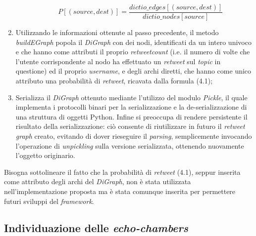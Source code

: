 \begin{enumerate}
\begin{itemize}
\begin{equation}
P[(source,dest)] = \frac{dictio\_edges[(source,dest)]}{dictio\_nodes[source]}
\end{equation}

\end{itemize}
\item Utilizzando le informazioni ottenute al passo precedente, il metodo \textit{buildEGraph} popola il \textit{DiGraph} con dei nodi, identificati da un intero univoco e che hanno come attributi il proprio \textit{retweetcount} (i.e. il numero di volte che l'utente corrispondente al nodo ha effettuato un \textit{retweet} sul \textit{topic} in questione) ed il proprio \textit{username}, e degli archi diretti, che hanno come unico attributo una probabilità di \textit{retweet}, ricavata dalla formula (4.1);

\item Serializza il \textit{DiGraph} ottenuto mediante l'utilizzo del modulo \textit{Pickle}, il quale implementa i protocolli binari per la serializzazione e la de-serializzazione di una struttura di oggetti Python. Infine si preoccupa di rendere persistente il risultato della serializzazione: ciò consente di riutilizzare in futuro il \textit{retweet graph} creato, evitando di dover rieseguire il \textit{parsing}, semplicemente invocando l'operazione di \textit{unpickling} sulla versione serializzata, ottenendo nuovamente l'oggetto originario.  
\end{enumerate}
Bisogna sottolineare il fatto che la probabilità di \textit{retweet} (4.1), seppur inserita come attributo degli archi del \textit{DiGraph}, non è stata utilizzata nell'implementazione proposta ma è stata comunque inserita per permettere futuri sviluppi del \textit{framework}.
\\
\subsection{Individuazione delle \textit{echo-chambers}}

